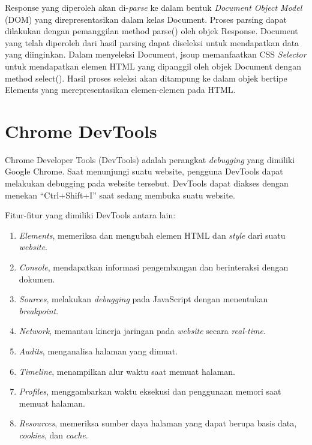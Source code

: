 Response yang diperoleh akan di-\textit{parse} ke dalam bentuk \textit{Document Object Model} (DOM) yang direpresentasikan dalam kelas Document. Proses parsing dapat dilakukan dengan pemanggilan method parse() oleh objek Response. Document yang telah diperoleh dari hasil parsing dapat diseleksi untuk mendapatkan data yang diinginkan. Dalam menyeleksi Document, jsoup memanfaatkan CSS \textit{Selector} untuk mendapatkan elemen HTML yang dipanggil oleh objek Document dengan method select(). Hasil proses seleksi akan ditampung ke dalam objek bertipe Elements yang merepresentasikan elemen-elemen pada HTML. 

\section{Chrome DevTools}
\label{sec:devtools}

Chrome Developer Tools (DevTools) \cite{devtools} adalah perangkat \textit{debugging} yang dimiliki Google Chrome. Saat menunjungi suatu website, pengguna DevTools dapat melakukan debugging pada website tersebut. DevTools dapat diakses dengan menekan "`Ctrl+Shift+I"' saat sedang membuka suatu website.  

Fitur-fitur yang dimiliki DevTools antara lain:
\begin{enumerate}
	\item \textit{Elements}, memeriksa dan mengubah elemen HTML dan \textit{style} dari suatu \textit{website}.
	\item \textit{Console}, mendapatkan informasi pengembangan dan berinteraksi dengan dokumen.
	\item \textit{Sources}, melakukan \textit{debugging} pada JavaScript dengan menentukan \textit{breakpoint}.
	\item \textit{Network}, memantau kinerja jaringan pada \textit{website} secara \textit{real-time}.
	\item \textit{Audits}, menganalisa halaman yang dimuat.
	\item \textit{Timeline}, menampilkan alur waktu saat memuat halaman.
	\item \textit{Profiles}, menggambarkan waktu eksekusi dan penggunaan memori saat memuat halaman.
	\item \textit{Resources}, memeriksa sumber daya halaman yang dapat berupa basis data, \textit{cookies}, dan \textit{cache}.
\end{enumerate}

